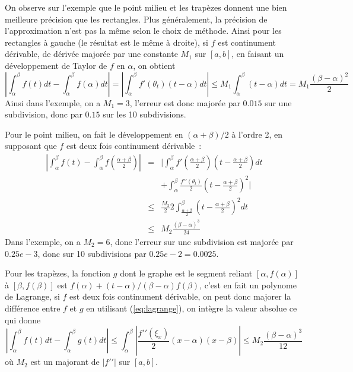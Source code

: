 \documentclass[a4paper,11pt]{article}
\begin{document}
On observe sur l'exemple que le point milieu et les trapèzes donnent
une bien meilleure précision que les rectangles. Plus généralement,
la précision de l'approximation n'est pas la même selon le choix
de méthode.
Ainsi pour les rectangles à gauche (le résultat est le même
à droite), si $f$ est continument dérivable, de dérivée majorée
par une constante $M_1$ sur $[a,b]$, en faisant un
développement de Taylor de $f$ en $\alpha$, on obtient
\[ |\int_{\alpha}^{\beta} f(t) dt - \int_{\alpha}^{\beta} f(\alpha) dt |
= | \int_{\alpha}^{\beta} f'(\theta_t)(t-\alpha) dt |
\leq M_1 \int_{\alpha}^{\beta} (t-\alpha) dt = M_1\frac{(\beta-\alpha)^2}{2}
\]
Ainsi dans l'exemple, on a $M_1=3$, l'erreur est donc majorée par $0.015$
sur une subdivision, donc par $0.15$ sur les 10 subdivisions.

Pour le point milieu, on fait le développement en $(\alpha+\beta)/2$ à l'ordre
2, en supposant que $f$ est deux fois continument dérivable~:
\begin{eqnarray*}
 |\int_{\alpha}^{\beta} f(t)  - \int_{\alpha}^{\beta} f(\frac{\alpha+\beta}{2})  |
&= &| \int_{\alpha}^{\beta} f'(\frac{\alpha+\beta}{2})(t-\frac{\alpha+\beta}{2}) dt
\\
& &
+  \int_{\alpha}^{\beta} \frac{f'{'}(\theta_t)}{2}(t-\frac{\alpha+\beta}{2})^2 |
\\
&\leq & \frac{M_2}{2} 2 \int_{\frac{\alpha+\beta}{2}}^{\beta}
(t-\frac{\alpha+\beta}{2})^2 dt  \\
& \leq & M_2\frac{(\beta-\alpha)^3}{24}
\end{eqnarray*}
Dans l'exemple, on a $M_2=6$, donc l'erreur sur une subdivision est
majorée par $0.25e-3$, donc sur 10 subdivisions par $0.25e-2=0.0025$.

Pour les trapèzes, la fonction $g$ dont le graphe est le segment reliant
$[\alpha,f(\alpha)]$ à $[\beta,f(\beta)]$ est $f(\alpha)+(t-\alpha)/(\beta-\alpha)f(\beta)$,
c'est en fait un polynome de Lagrange, si $f$ est deux fois continument
dérivable, on peut donc majorer la différence
entre $f$ et $g$ en utilisant (\ref{eq:lagrange}), on intègre la valeur
absolue ce qui donne
\[ |\int_{\alpha}^{\beta} f(t) dt - \int_{\alpha}^{\beta} g(t) dt |
\leq \int_{\alpha}^{\beta} |\frac{f'{'}(\xi_x)}{2} (x-\alpha)(x-\beta)|
\leq M_2 \frac{(\beta-\alpha)^3}{12} \]
où $M_2$ est un majorant de $|f'{'}|$ sur $[a,b]$.
\end{document}
